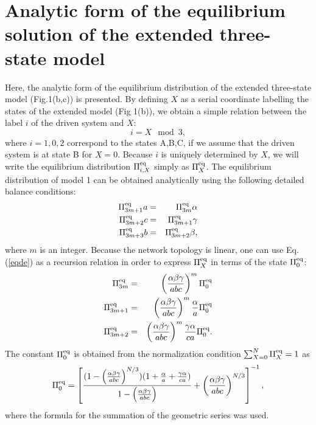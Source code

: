 \documentclass[aps,pre,amsmath,amssymb,floatfix,preprint,nofootinbib]{revtex4}
\begin{document}
\section{Analytic form of the equilibrium solution of the extended three-state model}\label{eqsol}
Here, the analytic form of the equilibrium distribution of the extended three-state model (Fig.1(b,c)) is presented.
By defining $X$ as a serial coordinate labelling the states of the extended model (Fig 1(b)), we obtain a simple relation between the label $i$ of the driven system and $X$:
\begin{equation}
i=X \mod 3,
\end{equation}
where $i=1,0,2$ correspond to the states A,B,C, if we assume that the driven system is at state B for $X=0$. Because $i$ is uniquely determined by $X$, we will write the equilibrium distribution $\Pi^{\rm eq}_{i,X}$ simply as $\Pi^{\rm eq}_{X}$. The equilibrium distribution of model 1 can be obtained analytically using the following detailed balance conditions:
\begin{eqnarray}
\Pi^{\rm eq}_{3m+1}a &=& \Pi^{\rm eq}_{3m}\alpha \nonumber\\
\Pi^{\rm eq}_{3m+2}c &=& \Pi^{\rm eq}_{3m+1}\gamma \nonumber\\
\Pi^{\rm eq}_{3m+3}b &=& \Pi^{\rm eq}_{3m+2}\beta, \label{eqde}
\end{eqnarray}
where $m$ is an integer.
Because the network topology is linear, one can use Eq.(\ref{eqde}) as a recursion relation in order to express $\Pi^{\rm eq}_{X}$ in terms of the state 
$\Pi^{\rm eq}_{0}$:
\begin{eqnarray}
\Pi^{\rm eq}_{3m} &=& \left(\frac{\alpha\beta\gamma}{abc}\right)^m\Pi^{\rm eq}_{0} \nonumber\\
\Pi^{\rm eq}_{3m+1} &=& \left(\frac{\alpha\beta\gamma}{abc}\right)^m\frac{\alpha}{a}\Pi^{\rm eq}_{0} \nonumber\\
\Pi^{\rm eq}_{3m+2} &=& \left(\frac{\alpha\beta\gamma}{abc}\right)^m\frac{\gamma \alpha}{ca}\Pi^{\rm eq}_{0} . \label{eqdi}
\end{eqnarray}
The constant $\Pi^{\rm eq}_{0}$ is obtained from the normalization condition $\sum_{X=0}^N \Pi^{\rm eq}_X = 1$ as
\begin{equation}
\Pi^{\rm eq}_{0} = \left[ \frac{(1- \left(\frac{\alpha\beta\gamma}{abc}\right)^{N/3})(1+ \frac{\alpha}{a}+\frac{\gamma \alpha}{ca})}{1- \left(\frac{\alpha\beta\gamma}{abc}\right)} + \left(\frac{\alpha\beta\gamma}{abc}\right)^{N/3} \right]^{-1},\label{pino}
\end{equation}
where the formula for the summation of the geometric series was used.
\end{document}
